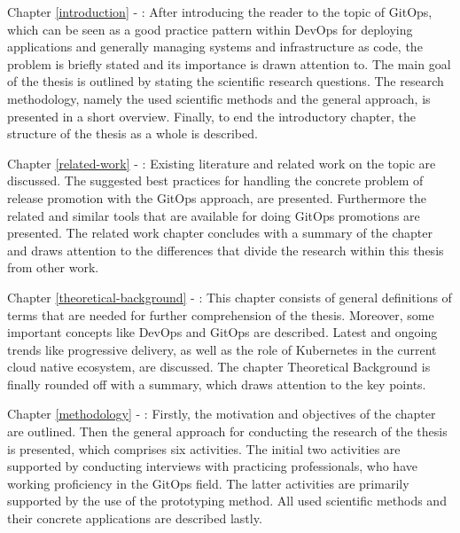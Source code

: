 Chapter \ref{introduction} - :
After introducing the reader to the topic of GitOps, which can be seen as a good practice pattern within DevOps for deploying applications and generally managing systems and infrastructure as code,
the problem is briefly stated and its importance is drawn attention to.
The main goal of the thesis is outlined by stating the scientific research questions.
The research methodology, namely the used scientific methods and the general approach, is presented in a short overview.
Finally, to end the introductory chapter, the structure of the thesis as a whole is described.

Chapter \ref{related-work} - :
Existing literature and related work on the topic are discussed.
The suggested best practices for handling the concrete problem of release promotion with the GitOps approach,
are presented.
Furthermore the related and similar tools that are available for doing GitOps promotions are presented.
The related work chapter concludes with a summary of the chapter and draws attention to the differences
that divide the research within this thesis from other work.

Chapter \ref{theoretical-background} - :
This chapter consists of general definitions of terms that are needed for further comprehension of the thesis.
Moreover, some important concepts like DevOps and GitOps are described.
Latest and ongoing trends like progressive delivery, as well as
the role of Kubernetes in the current cloud native ecosystem,
are discussed.
The chapter Theoretical Background is finally rounded off with a summary,
which draws attention to the key points.

Chapter \ref{methodology} - :
Firstly, the motivation and objectives of the chapter are outlined.
Then the general approach for conducting the research of the thesis is presented,
which comprises six activities. The initial two activities are supported by conducting interviews
with practicing professionals, who have working proficiency in the GitOps field.
The latter activities are primarily supported by the use of the prototyping method.
All used scientific methods and their concrete applications are described lastly.

